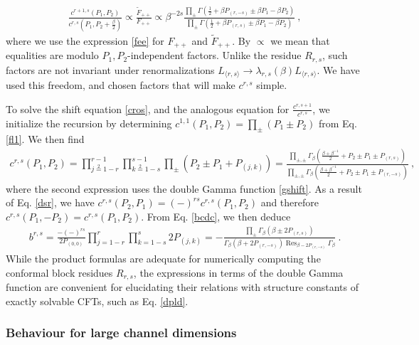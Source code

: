 \documentclass[12pt, a4paper]{article}
\theoremstyle{break}
\begin{document}
\begin{align}
 \frac{c^{r+1,s}(P_1,P_2)}{c^{r,s}(P_1,P_2+\frac{\beta}{2})} \propto \frac{\widetilde{F}_{++}}{F_{++}} \propto \beta^{-2s}\frac{\prod_{\pm} \Gamma(\frac12+\beta P_{(r,-s)} \pm \beta P_1 -\beta P_2)}{\prod_{\pm} \Gamma(\frac12+\beta P_{(r,s)} \pm \beta P_1 -\beta P_2)} \ , 
 \label{cros}
\end{align}
where we use the expression \eqref{fee} for $F_{++}$ and $\widetilde{F}_{++}$. By $\propto$ we mean that equalities are modulo $P_1,P_2$-independent factors. Unlike the residue $R_{r,s}$, such factors are not invariant under renormalizations $L_{\langle r,s\rangle} \to \lambda_{r,s}(\beta)L_{\langle r,s\rangle}$. We have used this freedom, and chosen factors that will make $c^{r,s}$ simple. 

To solve the shift equation \eqref{cros}, and the analogous equation for $\frac{c^{r,s+1}}{c ^{r,s}}$, we initialize the recursion by determining $c^{1,1}(P_1,P_2) =\prod_\pm (P_1\pm P_2) $ from Eq. \eqref{fl1}. We then find 
\begin{align}
 c^{r,s}(P_1,P_2) = \prod_{j\overset{2}{=}1-r}^{r-1} \prod_{k\overset{2}{=}1-s}^{s-1} \prod_\pm \left(P_2\pm P_1+ P_{(j,k)}\right) = \frac{\prod_{\pm,\pm}\Gamma_\beta\left(\frac{\beta+\beta^{-1}}{2} +P_2\pm P_1 \pm P_{(r,s)}\right)}
 {\prod_{\pm,\pm}\Gamma_\beta\left(\frac{\beta+\beta^{-1}}{2} +P_2\pm P_1 \pm P_{(r,-s)}\right)}\ , 
 \label{crs}
\end{align}
where the second expression uses the double Gamma function \eqref{gshift}. As a result of Eq. \eqref{dsr}, we have $c^{r,s}(P_2,P_1)=(-)^{rs} c^{r,s}(P_1,P_2)$ and therefore $c^{r,s}(P_1,-P_2)=c^{r,s}(P_1,P_2)$. From Eq. \eqref{bcdc}, we then deduce 
\begin{align}
 b^{r,s} = \frac{-(-)^{rs}}{2P_{(0,0)}} \prod_{j=1-r}^r\prod_{k=1-s}^s 2P_{(j,k)} = -
 \frac{\prod_\pm \Gamma_\beta\left(\beta \pm 2P_{(r,s)}\right)}{\Gamma_\beta\left(\beta+2P_{(r,-s)}\right)\operatorname{Res}_{\beta-2P_{(r,-s)}}\Gamma_\beta}\ .
 \label{brs}
\end{align}
While the product formulas are adequate for numerically computing the conformal block residues $R_{r,s}$, the expressions in terms of the double Gamma function are convenient for elucidating their relations with structure constants of exactly solvable CFTs, such as Eq. \eqref{dpld}.

\subsubsection{Behaviour for large channel dimensions}
\end{document}
